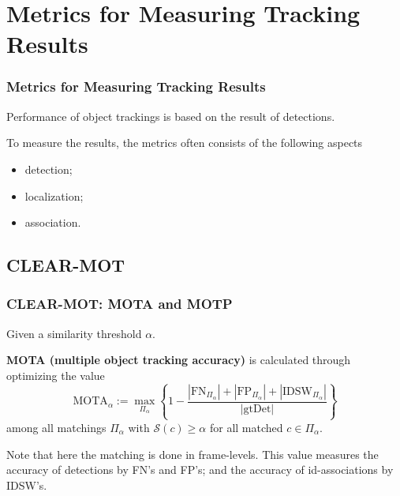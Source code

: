 \documentclass[slidestop, mathserif]{beamer}
\begin{document}
\section{Metrics for Measuring Tracking Results}

\begin{frame}
    \frametitle{Metrics for Measuring Tracking Results}

    Performance of object trackings is based on the result of detections.

    \quad 

    To measure the results, the metrics often consists of the following aspects
    \begin{itemize}
    \item detection;%
    \item localization;%
    \item association.%
    \end{itemize}
    
\end{frame}

\subsection{CLEAR-MOT}

\begin{frame}
    \frametitle{CLEAR-MOT: MOTA and MOTP}


    Given a similarity threshold $\alpha$.

    \quad

    {\bf MOTA (multiple object tracking accuracy)} is calculated through optimizing the value
    \[
        \text{MOTA}_\alpha :=
            \max_{\Pi_\alpha}
            \left\{1 - \dfrac{|\text{FN}_{\Pi_\alpha}| + |\text{FP}_{\Pi_\alpha}| + |\text{IDSW}_{\Pi_\alpha}|}{|\text{gtDet}|}\right\}
    \]
    among all matchings $\Pi_\alpha$ with $\mathcal S(c)\geq \alpha$ for all matched $c\in\Pi_\alpha$.

    \quad

    Note that here the matching is done in frame-levels.
    This value measures the accuracy of detections by FN's and FP's;
    and the accuracy of id-associations by IDSW's.

\end{frame}
\end{document}
